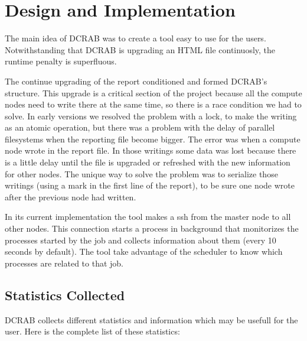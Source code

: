 \documentclass[10pt,a4paper]{report}
\begin{document}
\chapter{Design and Implementation}

The main idea of DCRAB was to create a tool easy to use for the users. Notwithstanding that DCRAB is upgrading an HTML file continuosly, the runtime penalty is superfluous.

The continue upgrading of the report conditioned and formed DCRAB's structure. This upgrade is a critical section of the project because all the compute nodes need to write there at the same time, so there is a race condition we had to solve. In early versions we resolved the problem with a lock, to make the writing as an atomic operation, but there was a problem with the delay of parallel filesystems when the reporting file become bigger. The error was when a compute node wrote in the report file. In those writings some data was lost because there is a little delay until the file is upgraded or refreshed with the new information for other nodes. The unique way to solve the problem was to serialize those writings (using a mark in the first line of the report), to be sure one node wrote after the previous node had written.

In its current implementation the tool makes a ssh from the master node to all other nodes. This connection starts a process in background that monitorizes the processes started by the job and collects information about them (every 10 seconds by default). The tool take advantage of the scheduler to know which processes are related to that job.

\section{Statistics Collected}

DCRAB collects different statistics and information which may be usefull for the user. Here is the complete list of these statistics:
\end{document}
